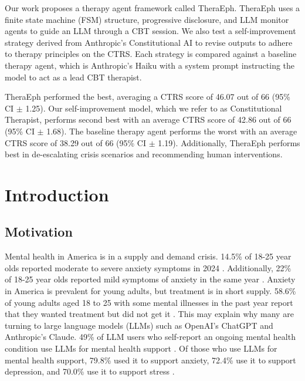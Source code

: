 \documentclass[twoside]{report}
\begin{document}
Our work proposes a therapy agent framework called TheraEph. TheraEph uses a finite state machine (FSM) structure, progressive disclosure, and LLM monitor agents to guide an LLM through a CBT session. We also test a self-improvement strategy derived from Anthropic's Constitutional AI to revise outputs to adhere to therapy principles on the CTRS. Each strategy is compared against a baseline therapy agent, which is Anthropic's Haiku with a system prompt instructing the model to act as a lead CBT therapist.

TheraEph performed the best, averaging a CTRS score of 46.07 out of 66 (95\% CI $\pm$ 1.25). Our self-improvement model, which we refer to as Constitutional Therapist, performs second best with an average CTRS score of 42.86 out of 66 (95\% CI $\pm$ 1.68). The baseline therapy agent performs the worst with an average CTRS score of 38.29 out of 66 (95\% CI $\pm$ 1.19). Additionally, TheraEph performs best in de-escalating crisis scenarios and recommending human interventions.
\chapter{Introduction}

\section{Motivation}
Mental health in America is in a supply and demand crisis. 14.5\% of 18-25 year olds reported moderate to severe anxiety symptoms in 2024 \cite{samhsa2024nsduh}. Additionally, 22\% of 18-25 year olds reported mild symptoms of anxiety in the same year \cite{samhsa2024nsduh}. Anxiety in America is prevalent for young adults, but treatment is in short supply. 58.6\% of young adults aged 18 to 25 with some mental illnesses in the past year report that they wanted treatment but did not get it \cite{samhsa2024nsduh}. This may explain why many are turning to large language models (LLMs) such as OpenAI's ChatGPT and Anthropic's Claude. 49\% of LLM users who self-report an ongoing mental health condition use LLMs for mental health support \cite{sentio2024survey}. Of those who use LLMs for mental health support, 79.8\% used it to support anxiety, 72.4\% use it to support depression, and 70.0\% use it to support stress \cite{sentio2024survey}.
\end{document}
